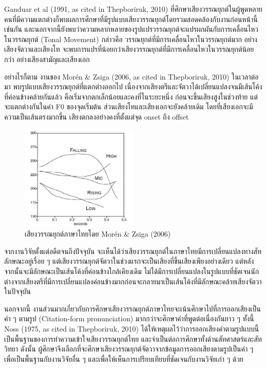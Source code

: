 \documentclass[a4paper]{article}
\begin{document}
    Ganduar et al (1991, as cited in Thepboriruk, 2010) ที่ศึกษาเสียงวรรณยุกต์ในผู้พูดหลายคนที่มีความแตกต่างก็พบผลการศึกษาที่มีรูปแบบเสียงวรรณยุกต์โดยรวมสอดคล้องกับงานก่อนหน้านี้เช่นกัน และนอกจากนี้ยังพบว่าความหลากหลายของรูปแปรวรรณยุกต์จะแปรผกผันกับการเคลื่อนไหวในวรรณยุกต์ (Tonal Movement) กล่าวคือ วรรณยุกต์ที่มีการเคลื่อนไหวในวรรณยุกต์มาก อย่างเสียงจัตวาและเสียงโท จะพบการแปรที่น้อยกว่าเสียงวรรณยุกต์ที่มีการเคลื่อนไหวในวรรณยุกต์น้อยกว่า อย่างเสียงสามัญและเสียงเอก

    อย่างไรก็ตาม งานของ Morén \& Zsiga (2006, as cited in Thepboriruk, 2010) ในเวลาต่อมา พบรูปแบบเสียงวรรณยุกต์ที่แตกต่างออกไป เนื่องจากเสียงตรีและจัตวาได้เปลี่ยนแปลงจนมีเส้นโค้งที่ค่อนข้างคล้ายกันแล้ว คือเริ่มจากตกเล็กน้อยและคงที่ในระยะหนึ่ง ก่อนจะขึ้นเสียงสูงในช่วงท้าย แต่จะแตกต่างกันในค่า F0 ของจุดเริ่มต้น ส่วนเสียงโทและเสียงเอกจะยังคล้ายเดิม โดยที่เสียงเอกจะมีความเป็นเส้นตรงมากขึ้น เสียงตกลงอย่างคงที่ตั้งแต่จุด onset ถึง offset
    \begin{figure}[!ht]
        \begin{center}
        \includegraphics[width=0.5\textwidth]{zsiga}
        \end{center}
        \caption{เสียงวรรณยุกต์ภาษาไทยโดย Morén \& Zsiga (2006)}
    \end{figure}

    จากงานวิจัยตั้งแต่อดีตจนถึงปัจจุบัน จะเห็นได้ว่าเสียงวรรณยุกต์ในภาษาไทยมีการเปลี่ยนแปลงทางสัทลักษณะอยู่เรื่อย ๆ แต่เสียงวรรณยุกต์จัตวาในช่วงแรกจะเป็นเสียงที่ขึ้นเสียงเพียงอย่างเดียว แต่หลังจากนั้นจะมีลักษณะเป็นเส้นโค้งที่ค่อนข้างใกล้เคียงเดิม ไม่ได้มีการเปลี่ยนแปลงในรูปแบบที่ชัดเจนนัก ต่างจากเสียงตรีที่มีการเปลี่ยนแปลงค่อนข้างมากก่อนจะกลายมาเป็นเส้นโค้งที่มีลักษณะคล้ายเสียงจัตวาในปัจจุบัน

    นอกจากนี้ งานส่วนมากเกี่ยวกับการศึกษาเสียงวรรณยุกต์ภาษาไทยจะเน้นศึกษาไปที่การออกเสียงเป็นคำ ๆ ตามรูป (Citation-form pronunciation) มากกว่าจะศึกษาคำที่พูดต่อเนื่องกันยาว ๆ ทั้งนี้ Noss (1975, as cited in Thepboriruk, 2010) ได้ให้เหตุผลไว้ว่าการออกเสียงคำตามรูปแบบนี้เป็นพื้นฐานของการทำความเข้าใจเสียงวรรณยุกต์ไทย และจำเป็นต่อการศึกษาทั้งด้านสัทศาสตร์และสัทวิทยา ดังนั้น ผู้ศึกษาจึงเลือกที่จะศึกษาเสียงวรรณยุกต์จัตวาจากข้อมูลการออกเสียงตามรูปเป็นคำ ๆ เพื่อเป็นพื้นฐานกับงานวิจัยอื่น ๆ และเพื่อให้เห็นการเปรียบเทียบที่ชัดเจนกับงานวิจัยเก่า ๆ ด้วย
\end{document}
